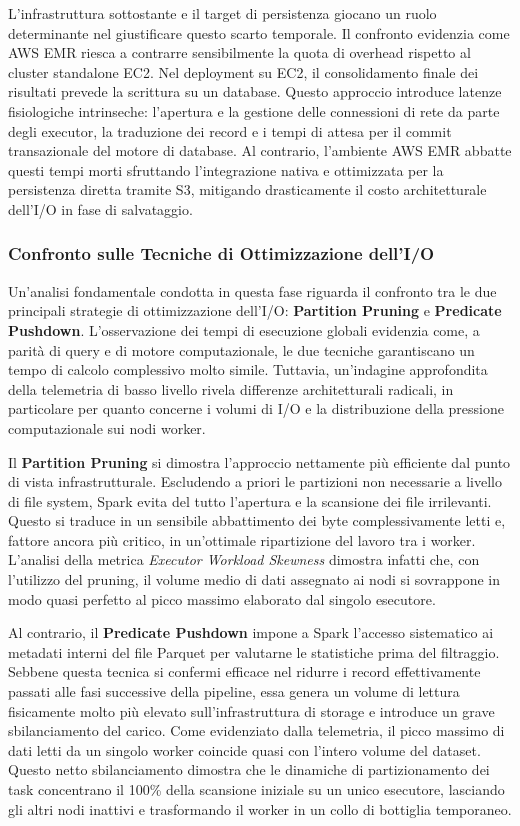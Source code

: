 \documentclass[conference]{IEEEtran}
\begin{document}
L'infrastruttura sottostante e il target di persistenza giocano un ruolo determinante nel giustificare questo scarto temporale.
Il confronto evidenzia come AWS EMR riesca a contrarre sensibilmente la quota di overhead rispetto al cluster standalone EC2.
Nel deployment su EC2, il consolidamento finale dei risultati prevede la scrittura su un database.
Questo approccio introduce latenze fisiologiche intrinseche: l'apertura e la gestione delle connessioni di rete da parte degli executor, la traduzione dei record e i tempi di attesa per il commit transazionale del motore di database.
Al contrario, l'ambiente AWS EMR abbatte questi tempi morti sfruttando l'integrazione nativa e ottimizzata per la persistenza diretta tramite S3, mitigando drasticamente il costo architetturale dell'I/O in fase di salvataggio.

\subsubsection{Confronto sulle Tecniche di Ottimizzazione dell'I/O}
Un'analisi fondamentale condotta in questa fase riguarda il confronto tra le due principali strategie di ottimizzazione dell'I/O: \textbf{Partition Pruning} e \textbf{Predicate Pushdown}.
L'osservazione dei tempi di esecuzione globali evidenzia come, a parità di query e di motore computazionale, le due tecniche garantiscano un tempo di calcolo complessivo molto simile.
Tuttavia, un'indagine approfondita della telemetria di basso livello rivela differenze architetturali radicali, in particolare per quanto concerne i volumi di I/O e la distribuzione della pressione computazionale sui nodi worker.

Il \textbf{Partition Pruning} si dimostra l'approccio nettamente più efficiente dal punto di vista infrastrutturale.
Escludendo a priori le partizioni non necessarie a livello di file system, Spark evita del tutto l'apertura e la scansione dei file irrilevanti.
Questo si traduce in un sensibile abbattimento dei byte complessivamente letti e, fattore ancora più critico, in un'ottimale ripartizione del lavoro tra i worker.
L'analisi della metrica \textit{Executor Workload Skewness} dimostra infatti che, con l'utilizzo del pruning, il volume medio di dati assegnato ai nodi si sovrappone in modo quasi perfetto al picco massimo elaborato dal singolo esecutore.

Al contrario, il \textbf{Predicate Pushdown} impone a Spark l'accesso sistematico ai metadati interni del file Parquet per valutarne le statistiche prima del filtraggio.
Sebbene questa tecnica si confermi efficace nel ridurre i record effettivamente passati alle fasi successive della pipeline, essa genera un volume di lettura fisicamente molto più elevato sull'infrastruttura di storage e introduce un grave sbilanciamento del carico.
Come evidenziato dalla telemetria, il picco massimo di dati letti da un singolo worker coincide quasi con l'intero volume del dataset.
Questo netto sbilanciamento dimostra che le dinamiche di partizionamento dei task concentrano il 100\% della scansione iniziale su un unico esecutore, lasciando gli altri nodi inattivi e trasformando il worker in un collo di bottiglia temporaneo.
\end{document}
